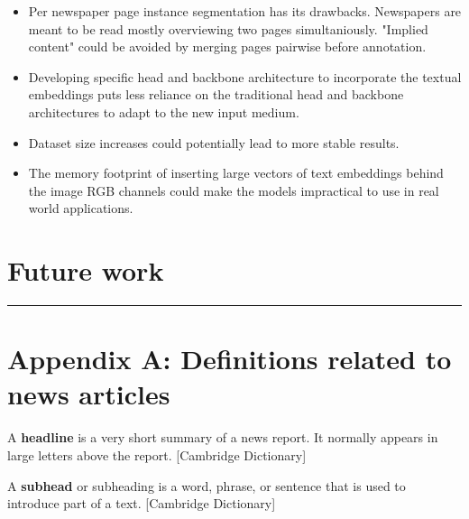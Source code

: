 \documentclass[oneside, english, bibtex]{kththesis}
\begin{document}
\begin{itemize}
\item Per newspaper page instance segmentation has its drawbacks. Newspapers are meant to be read mostly overviewing two pages simultaniously. "Implied content" could be avoided by merging pages pairwise before annotation.
\item Developing specific head and backbone architecture to incorporate the textual embeddings puts less reliance on the traditional head and backbone architectures to adapt to the new input medium.
\item Dataset size increases could potentially lead to more stable results.
\item The memory footprint of inserting large vectors of text embeddings behind the image RGB channels could make the models impractical to use in real world applications.
\end{itemize}

\section{Future work}


\noindent\rule{\textwidth}{0.4mm}

\cleardoublepage
\renewcommand{\bibname}{References}

\ifbiblatex
    \printbibliography[heading=bibintoc]
\else
    
\fi



\appendix
\renewcommand{\chaptermark}[1]{\markboth{Appendix \thechapter\relax:\thinspace\relax#1}{}}

\section{Appendix A: Definitions related to news articles}
\label{app:newsarticle}

\begin{definition}
\label{headline}
A \textbf{headline} is a very short summary of a news report. It normally appears in large letters above the report. [Cambridge Dictionary]
\end{definition}

\begin{definition}
\label{subhead}
A \textbf{subhead} or subheading is a word, phrase, or sentence that is used to introduce part of a text. [Cambridge Dictionary]
\end{definition}
\end{document}
